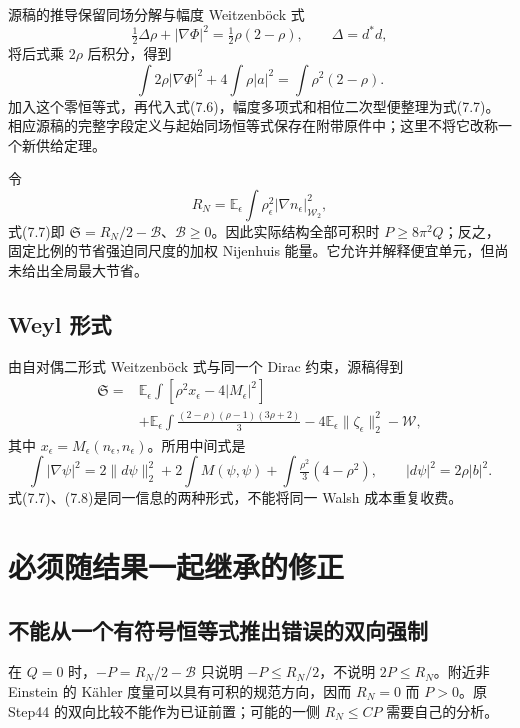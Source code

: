 \documentclass[UTF8,11pt,openany,fontset=none]{ctexbook}
\theoremstyle{definition}
\theoremstyle{remark}
\begin{document}
源稿的推导保留同场分解与幅度 Weitzenböck 式 \[
 \tfrac12\Delta\rho+|\nabla\Phi|^2=\tfrac12\rho(2-\rho),
 \qquad \Delta=d^*d,
\] 将后式乘 \(2\rho\) 后积分，得到 \[
 \int2\rho|\nabla\Phi|^2+4\int\rho|a|^2
 =\int\rho^2(2-\rho).
\] 加入这个零恒等式，再代入式(7.6)，幅度多项式和相位二次型便整理为式(7.7)。相应源稿的完整字段定义与起始同场恒等式保存在附带原件中；这里不将它改称一个新供给定理。\cite{B03}

令 \[
 R_N=\mathbb E_\epsilon\int\rho_\epsilon^2
 |\nabla n_\epsilon|_{\mathcal W_2}^2,
\] 式(7.7)即 \(\mathfrak S=R_N/2-\mathcal B\)、\(\mathcal B\ge0\)。因此实际结构全部可积时 \(P\ge8\pi^2Q\)；反之，固定比例的节省强迫同尺度的加权 Nijenhuis 能量。它允许并解释便宜单元，但尚未给出全局最大节省。

\subsection{Weyl 形式}\label{v7-weyl-ux5f62ux5f0f}

由自对偶二形式 Weitzenböck 式与同一个 Dirac 约束，源稿得到 \[
 \begin{aligned}
 \mathfrak S={}&\mathbb E_\epsilon\int
 [\rho^2x_\epsilon-4|M_\epsilon|^2]\\
 &+\mathbb E_\epsilon\int
 \frac{(2-\rho)(\rho-1)(3\rho+2)}3
 -4\mathbb E_\epsilon\|\zeta_\epsilon\|_2^2-\mathcal W,
 \end{aligned}
\tag{7.8}
\] 其中 \(x_\epsilon=M_\epsilon(n_\epsilon,n_\epsilon)\)。所用中间式是 \[
 \int|\nabla\psi|^2
 =2\|d\psi\|_2^2+2\int M(\psi,\psi)
 +\int\tfrac{\rho^2}{3}(4-\rho^2),
 \qquad |d\psi|^2=2\rho|b|^2.
\] 式(7.7)、(7.8)是同一信息的两种形式，不能将同一 Walsh 成本重复收费。

\section{必须随结果一起继承的修正}\label{v7-ux5fc5ux987bux968fux7ed3ux679cux4e00ux8d77ux7ee7ux627fux7684ux4feeux6b63}

\subsection{不能从一个有符号恒等式推出错误的双向强制}\label{v7-ux4e0dux80fdux4eceux4e00ux4e2aux6709ux7b26ux53f7ux6052ux7b49ux5f0fux63a8ux51faux9519ux8befux7684ux53ccux5411ux5f3aux5236}

在 \(Q=0\) 时，\(-P=R_N/2-\mathcal B\) 只说明 \(-P\le R_N/2\)，不说明 \(2P\le R_N\)。附近非 Einstein 的 Kähler 度量可以具有可积的规范方向，因而 \(R_N=0\) 而 \(P>0\)。原 Step44 的双向比较不能作为已证前置；可能的一侧 \(R_N\le CP\) 需要自己的分析。\cite{B02}
\end{document}
